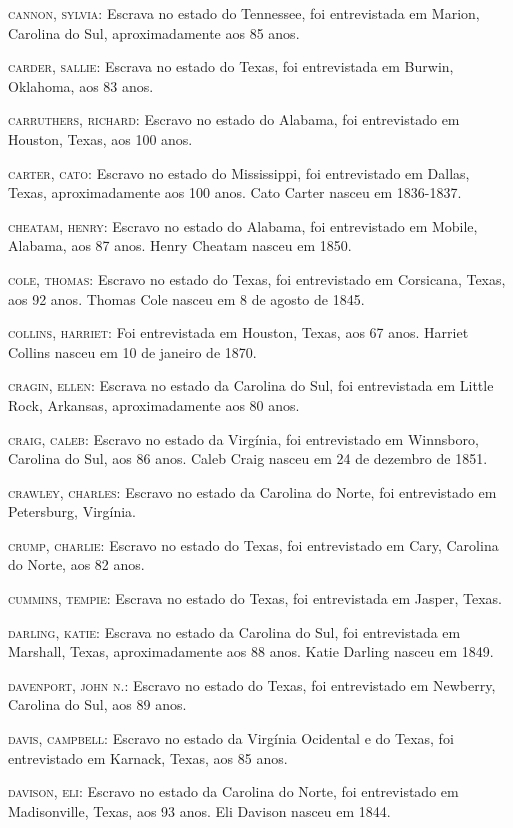 \begin{Parskip}
\textsc{cannon, sylvia:} Escrava no estado do Tennessee, foi
entrevistada em Marion, Carolina do Sul, aproximadamente aos 85 anos.

\textsc{carder, sallie:} Escrava no estado do Texas, foi entrevistada em
Burwin, Oklahoma, aos 83 anos.

\textsc{carruthers, richard:} Escravo no estado do Alabama, foi
entrevistado em Houston, Texas, aos 100 anos.

\textsc{carter, cato:} Escravo no estado do Mississippi, foi
entrevistado em Dallas, Texas, aproximadamente aos 100 anos. Cato Carter
nasceu em 1836-1837.

\textsc{cheatam, henry:} Escravo no estado do Alabama, foi entrevistado
em Mobile, Alabama, aos 87 anos. Henry Cheatam nasceu em 1850.

\textsc{cole, thomas:} Escravo no estado do Texas, foi entrevistado em
Corsicana, Texas, aos 92 anos. Thomas Cole nasceu em 8 de agosto de
1845.

\textsc{collins, harriet:} Foi entrevistada em Houston, Texas, aos 67
anos. Harriet Collins nasceu em 10 de janeiro de 1870.

\textsc{cragin, ellen:} Escrava no estado da Carolina do Sul, foi
entrevistada em Little Rock, Arkansas, aproximadamente aos 80 anos.

\textsc{craig, caleb:} Escravo no estado da Virgínia, foi entrevistado
em Winnsboro, Carolina do Sul, aos 86 anos. Caleb Craig nasceu em 24 de
dezembro de 1851.

\textsc{crawley, charles:} Escravo no estado da Carolina do Norte, foi
entrevistado em Petersburg, Virgínia.

\textsc{crump, charlie:} Escravo no estado do Texas, foi entrevistado em
Cary, Carolina do Norte, aos 82 anos.

\textsc{cummins, tempie:} Escrava no estado do Texas, foi entrevistada
em Jasper, Texas.

\textsc{darling, katie:} Escrava no estado da Carolina do Sul, foi
entrevistada em Marshall, Texas, aproximadamente aos 88 anos. Katie
Darling nasceu em 1849.

\textsc{davenport, john n.:} Escravo no estado do Texas, foi
entrevistado em Newberry, Carolina do Sul, aos 89 anos.

\textsc{davis, campbell:} Escravo no estado da Virgínia Ocidental e do
Texas, foi entrevistado em Karnack, Texas, aos 85 anos.

\textsc{davison, eli:} Escravo no estado da Carolina do Norte, foi
entrevistado em Madisonville, Texas, aos 93 anos. Eli Davison nasceu em
1844.


\end{Parskip}
